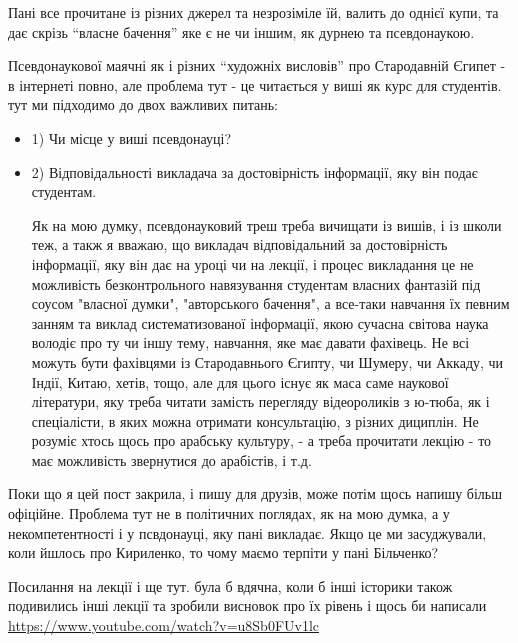 Пані все прочитане із різних джерел та незрозіміле їй, валить до однієї купи,
та дає скрізь \enquote{власне бачення} яке є не чи іншим, як дурнею та псевдонаукою.

Псевдонаукової маячні як  і різних \enquote{художніх висловів}  про Стародавній Єгипет
- в інтернеті повно, але проблема тут - це читається у виші як курс для
студентів. тут ми підходимо до двох важливих питань:

\begin{itemize}
\item 1) Чи місце у виші псевдонауці?
\item 2) Відповідальності викладача за достовірність інформації, яку він подає студентам.

Як на мою думку, псевдонауковий треш треба вичищати із вишів, і із школи теж, а
такж я вважаю, що викладач відповідальний за достовірність інформації, яку він
дає на уроці чи на лекції, і процес викладання це не можливість безконтрольного
навязування студентам власних фантазій під соусом "власної думки", "авторського
бачення", а все-таки навчання їх певним занням та виклад систематизованої
інформації, якою сучасна світова наука володіє про ту чи іншу тему, навчання,
яке має давати фахівець. Не всі можуть бути фахівцями із Стародавнього Єгипту,
чи Шумеру, чи Аккаду, чи Індії, Китаю, хетів, тощо, але для цього існує як маса
саме наукової літератури, яку треба читати замість перегляду відеороликів з
ю-тюба, як і спеціалісти, в яких можна отримати консультацію, з різних
дициплін. Не розуміє хтось щось про арабську культуру, - а треба прочитати
лекцію - то має можливість звернутися до арабістів, і т.д.

\end{itemize}

Поки що  я цей пост закрила, і пишу для друзів, може потім щось напишу більш
офіційне. Проблема тут не в політичних поглядах, як на мою думка, а у
некомпетентності  і у псвдонауці, яку пані викладає.  Якщо це ми засуджували,
коли йшлось про Кириленко, то чому маємо терпіти у пані Більченко?

Посилання на лекції і ще тут. була б вдячна, коли б інші історики також
подивились інші лекції та зробили висновок про їх рівень і щось би написали
\url{https://www.youtube.com/watch?v=u8Sb0FUv1lc}
